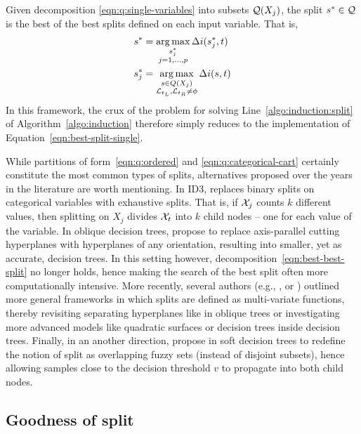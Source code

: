 Given decomposition \ref{eqn:q:single-variables} into subsets ${\cal Q}(X_j)$,
the split $s^* \in {\cal Q}$ is the best of the best splits defined on each input
variable. That is,
\begin{align}
s^* &= \operatorname*{arg\,max}_{\substack{s^*_j\\ j=1, \dots, p}} \Delta i(s^*_j, t) \label{eqn:best-best-split}\\
s^*_j &= \operatorname*{arg\,max}_{\substack{s \in Q(X_j)\\ {\cal L}_{t_L}, {\cal L}_{t_R} \neq \phi}} \Delta i(s, t) \label{eqn:best-split-single}
\end{align}
In this framework, the crux of the problem for solving
Line~\ref{algo:induction:split} of Algorithm~\ref{algo:induction} therefore
simply reduces to the implementation of Equation~\ref{eqn:best-split-single}.

While partitions of form~\ref{eqn:q:ordered} and \ref{eqn:q:categorical-cart}
certainly constitute the most common types of splits, alternatives proposed
over the years in the literature are worth mentioning. In ID3,
\citet{quinlan:1986} replaces binary splits on categorical variables with
exhaustive splits. That is, if ${\cal X}_j$ counts $k$ different values, then
splitting on $X_j$ divides ${\cal X}_t$ into $k$ child nodes -- one for each
value of the variable. In oblique decision trees, \citet{heath:1993} propose to
replace axis-parallel cutting hyperplanes with hyperplanes of any orientation,
resulting into smaller, yet as accurate, decision trees. In this setting
however, decomposition~\ref{eqn:best-best-split} no longer holds, hence making
the search of the best split often more computationally intensive. More
recently, several authors (e.g., \citep{gama:2004}, \citep{criminisi:2013} or
\citep{botta:2013}) outlined more general frameworks in which splits are
defined as multi-variate functions, thereby revisiting separating hyperplanes
like in oblique trees or investigating more advanced models like quadratic
surfaces or decision trees inside decision trees. Finally, in an another
direction, \citet{olaru:2003} propose in soft decision trees to redefine the
notion of split as overlapping fuzzy sets (instead of disjoint subsets), hence
allowing samples close to the decision threshold $v$ to propagate into both
child nodes.

\subsection{Goodness of split}
\label{sec:3:criteria}

